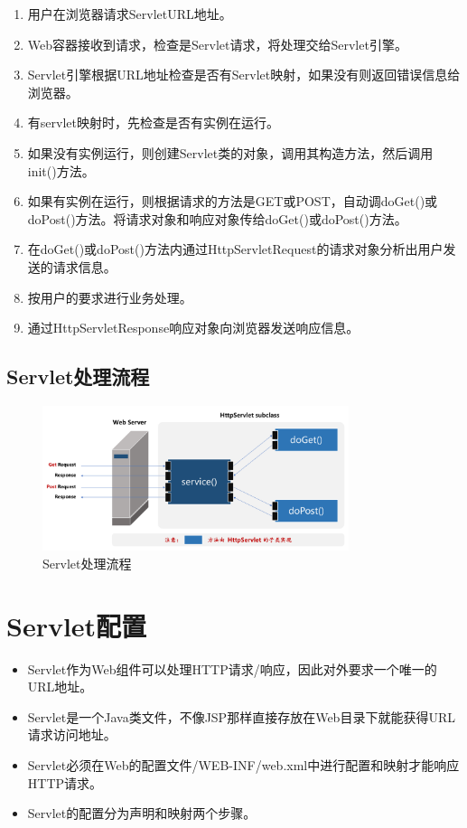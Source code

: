 \begin{enumerate}
\item 用户在浏览器请求ServletURL地址。
\item Web容器接收到请求，检查是Servlet请求，将处理交给Servlet引擎。
\item Servlet引擎根据URL地址检查是否有Servlet映射，如果没有则返回错误信息给浏览器。
\item 有servlet映射时，先检查是否有实例在运行。
\item 如果没有实例运行，则创建Servlet类的对象，调用其构造方法，然后调用init()方法。
\item 如果有实例在运行，则根据请求的方法是GET或POST，自动调doGet()或doPost()方法。将请求对象和响应对象传给doGet()或doPost()方法。
\item 在doGet()或doPost()方法内通过HttpServletRequest的请求对象分析出用户发送的请求信息。
\item 按用户的要求进行业务处理。
\item 通过HttpServletResponse响应对象向浏览器发送响应信息。
\end{enumerate}

\subsection{Servlet处理流程} 

\begin{figure}[htb]
\centering
\includegraphics[width=0.8\textwidth]{images/JavaEE-servlet-programming/fig-servlet-mechanism.pdf}
\caption{Servlet处理流程}
\label{fig:servlet-mechanism}
\end{figure}


\section{Servlet配置}

\begin{itemize}
\item Servlet作为Web组件可以处理HTTP请求/响应，因此对外要求一个唯一的URL地址。
\item Servlet是一个Java类文件，不像JSP那样直接存放在Web目录下就能获得URL请求访问地址。
\item Servlet必须在Web的配置文件{\Red /WEB-INF/web.xml}中进行配置和映射才能响应HTTP请求。
\item Servlet的配置分为{\hei 声明和映射}两个步骤。
\end{itemize}

